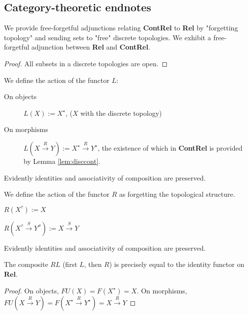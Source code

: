 \subsection{Category-theoretic endnotes}


We provide free-forgetful adjunctions relating \textbf{ContRel} to \textbf{Rel} by "forgetting topology" and sending sets to "free" discrete topologies. We exhibit a free-forgetful adjunction between \textbf{Rel} and \textbf{ContRel}.

\begin{lemma}\label{lem:disccont}
\begin{proof}
All subsets in a discrete topologies are open.
\end{proof}
\end{lemma}

\begin{defn} We define the action of the functor $L$:
\begin{description}
\item[On objects] $L(X) := X^\star$, ($X$ with the discrete topology)
\item[On morphisms] $L(X \overset{R}{\rightarrow} Y) := X^\star \overset{R}{\rightarrow} Y^\star$, the existence of which in \textbf{ContRel} is provided by Lemma \ref{lem:disccont}.
\end{description}
Evidently identities and associativity of composition are preserved.
\end{defn}

\begin{defn}
\begin{description} We define the action of the functor $R$ as forgetting the topological structure.
\item[On objects] $R(X^\tau) := X$
\item[On morphisms] $R(X^\tau \overset{S}{\rightarrow} Y^\sigma) := X \overset{S}{\rightarrow} Y$
\end{description}
Evidently identities and associativity of composition are preserved.
\end{defn}

\begin{lemma}[$RL = 1_{\textbf{Rel}}$]\label{lem:idadj}
The composite $RL$ (first $L$, then $R$) is precisely equal to the identity functor on $\mathbf{Rel}$.
\begin{proof}
On objects, $FU(X) = F(X^\star) = X$. On morphisms, $FU(X \overset{R}{\rightarrow} Y) = F(X^\star \overset{R}{\rightarrow} Y^\star) = X \overset{R}{\rightarrow} Y$
\end{proof}
\end{lemma}

